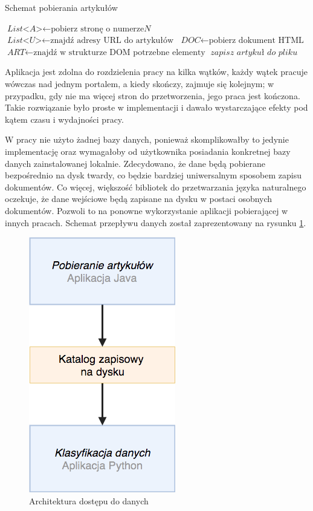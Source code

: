 \begin{algorithm}
\caption{Schemat pobierania artykułów}\label{alg:prediction-algorithm}
\begin{algorithmic}[1]
\State $\textit{List<A>} \gets \text{pobierz stronę o numerze}  \textit{N}$
 \State $\textit{List<U>} \gets \text{znajdź adresy URL do artykułów}$ 
    \State $\textit{DOC} \gets \text{pobierz dokument HTML}$
    \State $\textit{ART} \gets \text{znajdź w strukturze DOM potrzebne elementy}$ 
    \State $\textit{zapisz artykuł do pliku}$
	\EndFor
\EndFor
\label{euclidendwhile}
\EndFunction
\end{algorithmic}
\end{algorithm}

Aplikacja jest zdolna do rozdzielenia pracy na kilka wątków, każdy wątek pracuje wówczas nad jednym portalem, a kiedy skończy, zajmuje się kolejnym; w przypadku, gdy nie ma więcej stron do przetworzenia, jego praca jest kończona. Takie rozwiązanie było proste w implementacji i dawało wystarczające efekty pod kątem czasu i wydajności pracy. \cite{effective-java} 

W pracy nie użyto żadnej bazy danych, ponieważ skomplikowałby to jedynie implementację oraz wymagałoby od użytkownika posiadania konkretnej bazy danych zainstalowanej lokalnie. Zdecydowano, że dane będą pobierane bezpośrednio na dysk twardy, co będzie bardziej uniwersalnym sposobem zapisu dokumentów. Co więcej, większość bibliotek do przetwarzania języka naturalnego oczekuje, że dane wejściowe będą zapisane na dysku w postaci osobnych dokumentów. Pozwoli to na ponowne wykorzystanie aplikacji pobierającej w innych pracach. Schemat przepływu danych został zaprezentowany na rysunku \ref{fig:data-access}.



\begin{figure}[ht!]
	\centering
	\includegraphics[width=0.25\linewidth]{img/architektura-pobierania}
	\caption{Architektura dostępu do danych}
	\label{fig:data-access}
\end{figure}

